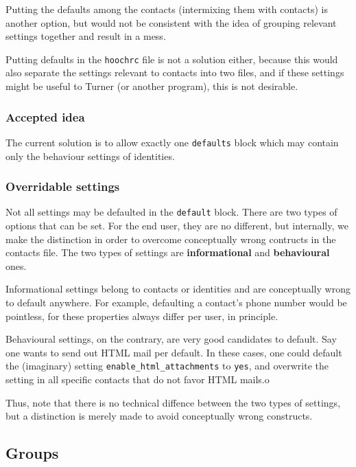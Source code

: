 \documentclass[a4paper]{article}
\begin{document}
Putting the defaults among the contacts (intermixing them with contacts)
is another option, but would not be consistent with the idea of grouping
relevant settings together and result in a mess.

Putting defaults in the \texttt{hoochrc} file is not a solution either,
because this would also separate the settings relevant to contacts into
two files, and if these settings might be useful to Turner (or another
program), this is not desirable.

\subsubsection{Accepted idea}

The current solution is to allow exactly one \texttt{defaults} block
which may contain only the behaviour settings of identities.

\subsubsection{Overridable settings}

Not all settings may be defaulted in the \texttt{default} block.  There
are two types of options that can be set.  For the end user, they are no
different, but internally, we make the distinction in order to overcome
conceptually wrong contructs in the contacts file.  The two types of
settings are \textbf{informational} and \textbf{behavioural} ones.

Informational settings belong to contacts or identities and are
conceptually wrong to default anywhere.  For example, defaulting a
contact's phone number would be pointless, for these properties always
differ per user, in principle.

Behavioural settings, on the contrary, are very good candidates to
default.  Say one wants to send out HTML mail per default.  In these
cases, one could default the (imaginary) setting
\texttt{enable\_html\_attachments} to \texttt{yes}, and overwrite the
setting in all specific contacts that do not favor HTML mails.o

Thus, note that there is no technical diffence between the two types of
settings, but a distinction is merely made to avoid conceptually wrong
constructs.


\subsection{Groups}
\end{document}
